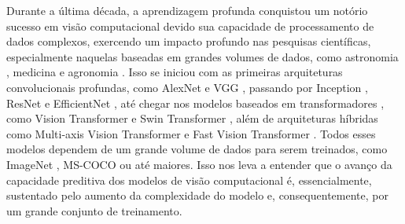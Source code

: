 Durante a última década, a aprendizagem profunda conquistou um notório sucesso em visão computacional devido sua capacidade de processamento de dados complexos, exercendo um impacto profundo nas pesquisas científicas, especialmente naquelas baseadas em grandes volumes de dados, como astronomia \cite{astro1, astro2}, medicina \cite{VGG16Ex03, InceptionResNetV2Ex03, InceptionResNetV2Ex02} e agronomia \cite{EfficientNetEx03, VGG16Ex02}. Isso se iniciou com as primeiras arquiteturas convolucionais profundas, como AlexNet \cite{alexnet-x} e VGG \cite{vgg16-x}, passando por Inception \cite{inception-x}, ResNet \cite{resnet-x} e EfficientNet \cite{efficientnet-x}, até chegar nos modelos baseados em transformadores \cite{transformers-x}, como Vision Transformer \cite{vit} e Swin Transformer \cite{swin}, além de arquiteturas híbridas como Multi-axis Vision Transformer \cite{maxvit} e Fast Vision Transformer \cite{fastvit}. Todos esses modelos dependem de um grande volume de dados para serem treinados, como ImageNet \cite{imagenet-x}, MS-COCO \cite{ms-coco} ou até maiores. Isso nos leva a entender que o avanço da capacidade preditiva dos modelos de visão computacional é, essencialmente, sustentado pelo aumento da complexidade do modelo e, consequentemente, por um grande conjunto de treinamento.




